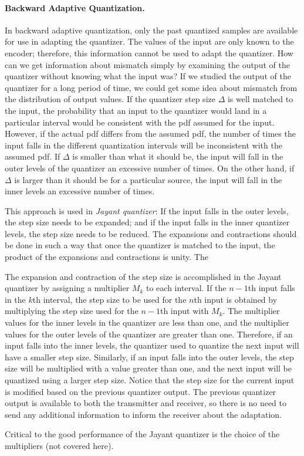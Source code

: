 \paragraph{Backward Adaptive Quantization.} In backward adaptive quantization, only the past quantized samples are available for use in adapting the quantizer. The values of the input are only known to the encoder; therefore, this information cannot be used to adapt the quantizer. How can we get information about mismatch simply by examining the output of the quantizer without knowing what the input was? If we studied the output of the quantizer for a long period of time, we could get some idea about mismatch from the distribution of output
values. If the quantizer step size $\Delta$ is well matched to the input, the probability that an input to the quantizer would land in a particular interval would be consistent with the pdf assumed for the input. However, if the actual pdf differs from the assumed pdf, the number of times the input falls in the different quantization intervals will be inconsistent with the assumed pdf. If $\Delta$ is smaller than what it should be, the input will fall in the outer levels of the quantizer an excessive number of times. On the other hand, if $\Delta$ is larger than it should be for a particular source, the input will fall in the inner levels an excessive number of times. 

This approach is used in \emph{Jayant quantizer}: If the input falls in the outer levels, the step size needs to be expanded; and if the input falls in the inner quantizer levels, the step size needs to be reduced. The expansions and contractions should be done in such a way that once the quantizer is matched to the input, the product of the expansions and contractions is unity. The 

The expansion and contraction of the step size is accomplished in the Jayant quantizer by assigning a multiplier $M_k$ to each interval. If the $n-1$th input falls in the $k$th interval, the step size to be used for the $n$th input is obtained by multiplying the step size used for the $n-1$th input with $M_k$. The multiplier values for the inner levels in the quantizer are less than one, and the multiplier values for the outer levels of the quantizer are greater than one. Therefore, if an input falls into the inner levels, the quantizer used to quantize the next input will have a smaller step size. Similarly, if an input falls into the outer levels, the step size will be multiplied with a value greater than one, and the next input will be quantized using a larger step size. Notice that the step size for the current input is modified based on the previous quantizer output. The previous quantizer output is available to both the transmitter and receiver, so there is no need to send any additional information to inform the receiver about the adaptation. 

Critical to the good performance of the Jayant quantizer is the choice of the multipliers (not covered here).


